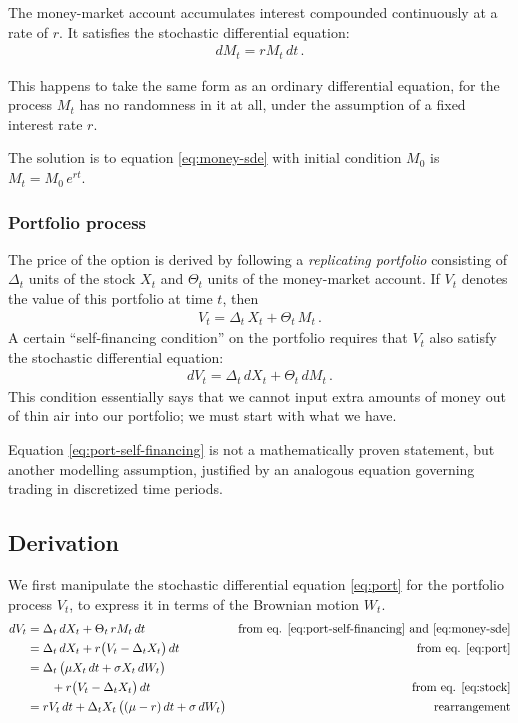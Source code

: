 \documentclass[12pt]{article}
\begin{document}
The money-market account accumulates interest compounded continuously
at a rate of $r$.
It satisfies the stochastic differential equation:
\begin{align}\label{eq:money-sde}
dM_t = rM_t \, dt\,.
\end{align}

This happens to take the same form as an ordinary differential equation,
 for the process $M_t$ has no randomness in it at all,
under the assumption of a fixed interest rate $r$.

The solution is to equation \eqref{eq:money-sde} with initial condition 
$M_0$ is $M_t = M_0 \, e^{rt}$.

\subsubsection{Portfolio process}
The price of the option is derived by following a \emph{replicating portfolio}
consisting of $\Delta_t$ units of the stock $X_t$
and $\Theta_t$ units of the money-market
account.  If $V_t$ denotes the value of this portfolio at time $t$,
then
\begin{align}\label{eq:port}
V_t = \Delta_t \, X_t + \Theta_t \, M_t\,.
\end{align}
A certain ``self-financing condition'' on the portfolio requires that
$V_t$ also satisfy the stochastic differential equation:
\begin{align}\label{eq:port-self-financing}
d V_t = \Delta_t \, dX_t + \Theta_t \, dM_t\,.
\end{align}
This condition essentially says that we cannot input extra amounts
of money out of thin air into our portfolio; we must start with what we have.

Equation \eqref{eq:port-self-financing} is not a mathematically proven statement,
but another modelling assumption, justified by an analogous equation
governing trading in discretized time periods.


\subsection{Derivation}

We first manipulate the
stochastic differential equation \eqref{eq:port}
for the portfolio process $V_t$,
to express it in terms of the Brownian motion $W_t$.
\begin{align*}
dV_t &= \Delta_t \, dX_t + \Theta_t \, r M_t \, dt
& \text{from eq. \eqref{eq:port-self-financing} and \eqref{eq:money-sde}} \\
&= \Delta_t \, dX_t + r\bigl(V_t - \Delta_t X_t\bigr) \, dt
& \text{from eq. \eqref{eq:port}} \\
&= \Delta_t \, \bigl(  \mu X_t \, dt + \sigma X_t \, dW_t \bigr) \\
& \qquad + r \bigl(V_t - \Delta_t X_t \bigr) \, dt 
& \text{from eq. \eqref{eq:stock}} \\
&= rV_t \, dt + \Delta_t X_t \, \bigl( (\mu - r) \, dt + \sigma \, dW_t \bigr) & \text{rearrangement}
\end{align*}
\end{document}
